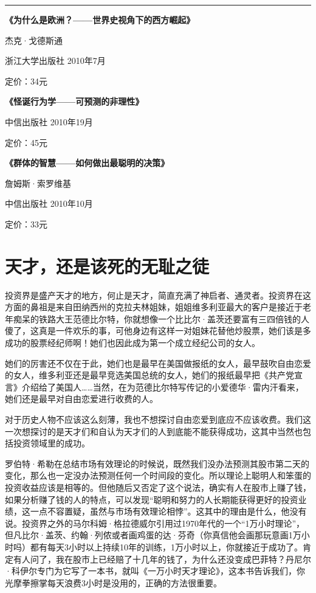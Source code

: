 \begin{center}\rule{0.5\linewidth}{0.5pt}\end{center}

\textbf{《为什么是欧洲？------世界史视角下的西方崛起》}

杰克·戈德斯通

浙江大学出版社 2010年7月

定价：34元

\textbf{《怪诞行为学------可预测的非理性》}

中信出版社 2010年19月

定价：45元

\textbf{《群体的智慧------如何做出最聪明的决策》}

詹姆斯·索罗维基

中信出版社 2010年10月

定价：33元

\hypertarget{ux5929ux624dux8fd8ux662fux8be5ux6b7bux7684ux65e0ux803bux4e4bux5f92}{%
\section{天才，还是该死的无耻之徒}\label{ux5929ux624dux8fd8ux662fux8be5ux6b7bux7684ux65e0ux803bux4e4bux5f92}}

投资界是盛产天才的地方，何止是天才，简直充满了神启者、通灵者。投资界在这方面的鼻祖是来自田纳西州的克拉夫林姐妹，姐姐维多利亚最大的客户是接近于老年痴呆的铁路大王范德比尔特，你就想像一个比比尔·盖茨还要富有三四倍钱的人傻了，这真是一件欢乐的事，可他身边有这样一对姐妹花替他炒股票，她们该是多成功的股票经纪师啊！她们也因此成为第一个成立经纪公司的女人。

她们的厉害还不仅在于此，她们也是最早在美国做报纸的女人，最早鼓吹自由恋爱的女人，维多利亚还是最早竞选美国总统的女人，她们的报纸最早把《共产党宣言》介绍给了美国人\ldots\ldots 当然，在为范德比尔特写传记的小爱德华·雷内汗看来，她们还是最早对自由恋爱进行收费的人。

对于历史人物不应该这么刻薄，我也不想探讨自由恋爱到底应不应该收费。我们这一次想探讨的是天才们和自认为天才们的人到底能不能获得成功，这其中当然也包括投资领域里的成功。

罗伯特·希勒在总结市场有效理论的时候说，既然我们没办法预测其股市第二天的变化，那么也一定没办法预测任何一个时间段的变化。所以理论上聪明人和笨蛋的投资收益应该是相等的。但他随后又否定了这个说法，确实有人在股市上赚了钱，如果分析赚了钱的人的特点，可以发现``聪明和努力的人长期能获得更好的投资业绩，这一点不容置疑，虽然与市场有效理论相悖''。这其中的理由是什么，他没有说。投资界之外的马尔科姆·格拉德威尔引用过1970年代的一个``1万小时理论''，但凡比尔·盖茨、约翰·列侬或者画鸡蛋的达·芬奇（你真信他会画那玩意画1万小时吗）都有每天3小时以上持续10年的训练，1万小时以上，你就接近于成功了。肯定有人问了，我在股市上已经赔了十几年的钱了，为什么还没变成巴菲特？丹尼尔·科伊尔专门为它写了一本书，就叫《一万小时天才理论》，这本书告诉我们，你光摩拳擦掌每天浪费3小时是没用的，正确的方法很重要。

